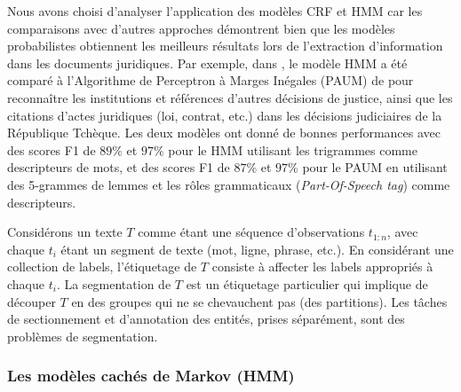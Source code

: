 Nous avons choisi d'analyser l'application des modèles CRF et HMM car les  comparaisons avec d'autres approches démontrent bien que les modèles probabilistes obtiennent les meilleurs résultats lors de l'extraction d'information dans les documents juridiques. Par exemple, dans \citet{Kriz2014nerinczechdecisions}, le modèle HMM a été comparé à l'Algorithme de Perceptron à Marges Inégales (PAUM) de \citet{li2002PAUM} pour reconnaître les institutions et références d'autres décisions de justice, ainsi que les citations d'actes juridiques (loi, contrat, etc.) dans les décisions judiciaires de la République Tchèque. Les deux modèles ont donné de bonnes performances avec des scores F1 de $ 89 \% $ et $ 97 \% $ pour le HMM utilisant les trigrammes comme descripteurs de mots, et des scores F1 de $ 87 \% $ et $ 97 \% $ pour le PAUM en utilisant des 5-grammes de lemmes et les rôles grammaticaux (\textit{Part-Of-Speech tag}) comme descripteurs. 

Considérons un texte $T$ comme étant une séquence d'observations $t_{1:n}$, avec chaque $t_i$ étant un segment de texte (mot, ligne, phrase, etc.). En considérant une collection de labels, l'étiquetage de $T$ consiste à affecter les labels appropriés à chaque $t_i$. La segmentation de $T$ est un étiquetage particulier qui implique de découper $T$ en des groupes qui ne se chevauchent pas (des partitions). Les tâches de sectionnement et d'annotation des entités, prises séparément, sont des problèmes de segmentation.

\subsubsection{Les modèles cachés de Markov (HMM)}
\label{sec:structuration:litérature-HMM}

